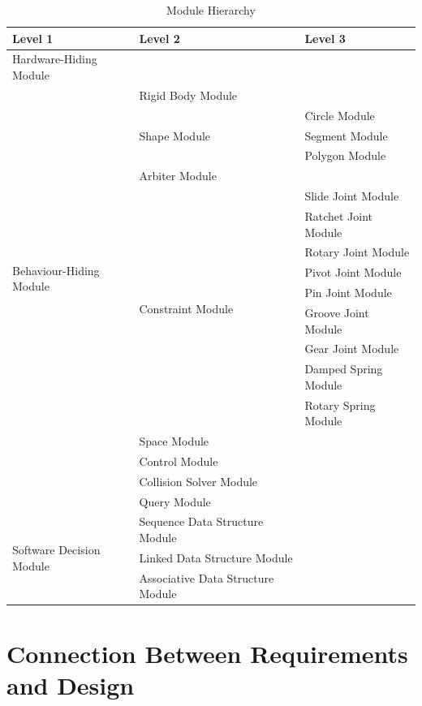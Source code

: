\documentclass[12pt]{article}
\begin{document}
\begin{table}[h!]
\centering
\begin{tabular}{p{} p{} p{}}
\toprule
\textbf{Level 1} & \textbf{Level 2}  & \textbf{Level 3} \\
\midrule

{Hardware-Hiding Module} & ~ \\
\midrule

\multirow{16}{0.3\textwidth}{Behaviour-Hiding Module} 
&Rigid Body Module\\ \cline{2-1} \cline{3-1}
& \multirow{3}{0.3\textwidth}{Shape Module} 
& Circle Module\\
& &Segment Module\\
& &Polygon Module\\
 \cline{2-1} \cline{3-1}
& Arbiter Module\\
 \cline{2-1} \cline{3-1}
& \multirow{9}{0.3\textwidth}{Constraint Module} 
& Slide Joint Module \\
& &Ratchet Joint Module \\
& &Rotary Joint Module \\
& &Pivot Joint Module \\
& &Pin Joint Module \\
& &Groove Joint Module \\
& &Gear Joint Module \\
& &Damped Spring Module \\
& &Rotary Spring Module \\
 \cline{2-1} \cline{3-1}

& Space Module\\ 
 \cline{2-1} \cline{3-1}
& Control Module\\
 \cline{2-1} \cline{3-1}
&  Collision Solver Module\\  \cline{2-1} \cline{3-1}
&  Query Module\\  
\midrule

\multirow{3}{0.3\textwidth}{Software Decision Module} 
& Sequence Data Structure Module\\  \cline{2-1} \cline{3-1}
& Linked Data Structure Module\\  \cline{2-1} \cline{3-1}
& Associative Data Structure Module\\  
\bottomrule

\end{tabular}
\caption{Module Hierarchy}
\label{TblMH}
\end{table}

\section{Connection Between Requirements and Design} \label{SecConnection}
\end{document}
